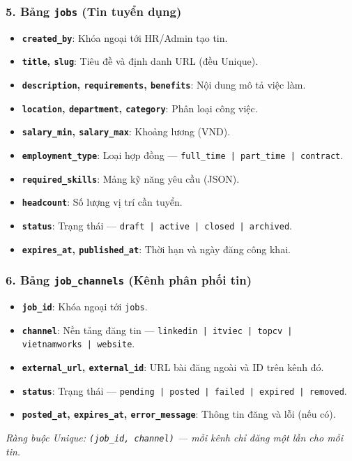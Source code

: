 \subsubsection*{5. Bảng \texttt{jobs} (Tin tuyển dụng)}
\begin{itemize}
    \item \textbf{\texttt{created\_by}}: Khóa ngoại tới HR/Admin tạo tin.
    \item \textbf{\texttt{title}, \texttt{slug}}: Tiêu đề và định danh URL (đều Unique).
    \item \textbf{\texttt{description}, \texttt{requirements}, \texttt{benefits}}: Nội dung mô tả việc làm.
    \item \textbf{\texttt{location}, \texttt{department}, \texttt{category}}: Phân loại công việc.
    \item \textbf{\texttt{salary\_min}, \texttt{salary\_max}}: Khoảng lương (VND).
    \item \textbf{\texttt{employment\_type}}: Loại hợp đồng --- \texttt{full\_time | part\_time | contract}.
    \item \textbf{\texttt{required\_skills}}: Mảng kỹ năng yêu cầu (JSON).
    \item \textbf{\texttt{headcount}}: Số lượng vị trí cần tuyển.
    \item \textbf{\texttt{status}}: Trạng thái --- \texttt{draft | active | closed | archived}.
    \item \textbf{\texttt{expires\_at}, \texttt{published\_at}}: Thời hạn và ngày đăng công khai.
\end{itemize}

\subsubsection*{6. Bảng \texttt{job\_channels} (Kênh phân phối tin)}
\begin{itemize}
    \item \textbf{\texttt{job\_id}}: Khóa ngoại tới \texttt{jobs}.
    \item \textbf{\texttt{channel}}: Nền tảng đăng tin --- \texttt{linkedin | itviec | topcv | vietnamworks | website}.
    \item \textbf{\texttt{external\_url}, \texttt{external\_id}}: URL bài đăng ngoài và ID trên kênh đó.
    \item \textbf{\texttt{status}}: Trạng thái --- \texttt{pending | posted | failed | expired | removed}.
    \item \textbf{\texttt{posted\_at}, \texttt{expires\_at}, \texttt{error\_message}}: Thông tin đăng và lỗi (nếu có).
\end{itemize}
\textit{Ràng buộc Unique: \texttt{(job\_id, channel)} --- mỗi kênh chỉ đăng một lần cho mỗi tin.}

